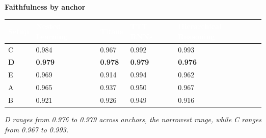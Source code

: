 \documentclass[10pt,a4paper,landscape]{article}
\begin{document}
\noindent\begin{minipage}{\textwidth}
{\normalsize\bfseries Faithfulness by anchor\par}\smallskip
{\footnotesize\setlength{\tabcolsep}{3.0pt}
\begin{tabular}{@{}>{\raggedright\arraybackslash}p{32mm}>{\raggedleft\arraybackslash}p{40mm}>{\raggedleft\arraybackslash}p{40mm}>{\raggedleft\arraybackslash}p{40mm}>{\raggedleft\arraybackslash}p{40mm}@{}}
\toprule
\rowcolor{tablehead}\textcolor{white}{\textbf{Setup}} & \textcolor{white}{\textbf{Nested Learning}} & \textcolor{white}{\textbf{Titans}} & \textcolor{white}{\textbf{TTT RNNs}} & \textcolor{white}{\textbf{Hierarchical Reasoning}} \\
\midrule
\rowcolor{topscore}C & \cellcolor{scoregood}0.984 & \cellcolor{scoremid}0.967 & \cellcolor{scoregood}0.992 & \cellcolor{scoregood}0.993 \\
\rowcolor{chosen}\textbf{D} & \cellcolor{scoregood}\textbf{0.979} & \cellcolor{scoregood}\textbf{0.978} & \cellcolor{scoregood}\textbf{0.979} & \cellcolor{scoregood}\textbf{0.976} \\
E & \cellcolor{scoremid}0.969 & \cellcolor{scorelow}0.914 & \cellcolor{scoregood}0.994 & \cellcolor{scoremid}0.962 \\
\rowcolor{zebra}A & \cellcolor{scoremid}0.965 & \cellcolor{scorelow}0.937 & \cellcolor{scoremid}0.950 & \cellcolor{scoremid}0.967 \\
B & \cellcolor{scorelow}0.921 & \cellcolor{scorelow}0.926 & \cellcolor{scoremid}0.949 & \cellcolor{scorelow}0.916 \\
\bottomrule
\end{tabular}\par}
\smallskip\noindent\textit{D ranges from 0.976 to 0.979 across anchors, the narrowest range, while C ranges from 0.967 to 0.993.}\par
\end{minipage}
\par\bigskip


\clearpage
\end{document}
